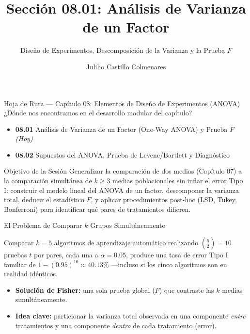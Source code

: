 \documentclass[10pt, aspectratio=169]{beamer}
\title[ANOVA de un Factor]{Sección 08.01: Análisis de Varianza de un Factor}
\subtitle{Diseño de Experimentos, Descomposición de la Varianza y la Prueba $F$}
\author[J. Castillo Colmenares]{Juliho Castillo Colmenares}
\institute{Tecnológico de Monterrey}
\date{\vspace{-1.2cm}}
\begin{document}
\begin{frame}[plain]
  \vspace{-0.8cm}
  \titlepage
\end{frame}

\begin{frame}{Hoja de Ruta --- Capítulo 08: Elementos de Diseño de Experimentos (ANOVA)}
  \footnotesize
  ¿Dónde nos encontramos en el desarrollo modular del capítulo? \pause
  \begin{itemize}\itemsep=0.08em
    \item \textbf{08.01} Análisis de Varianza de un Factor (One-Way ANOVA) y Prueba $F$ \emph{(Hoy)} \pause
    \item \textbf{08.02} Supuestos del ANOVA, Prueba de Levene/Bartlett y Diagnóstico
  \end{itemize}
  \vspace{-0.05cm}
  \begin{block}{Objetivo de la Sesión}
    Generalizar la comparación de dos medias (Capítulo 07) a la comparación simultánea de $k \geq 3$ medias poblacionales sin inflar el error Tipo I: construir el modelo lineal del ANOVA de un factor, descomponer la varianza total, deducir el estadístico $F$, y aplicar procedimientos post-hoc (LSD, Tukey, Bonferroni) para identificar qué pares de tratamientos difieren.
  \end{block}
\end{frame}

\begin{frame}{El Problema de Comparar $k$ Grupos Simultáneamente}
  \footnotesize
  \begin{motivacion}
    Comparar $k=5$ algoritmos de aprendizaje automático realizando $\binom{5}{2}=10$ pruebas $t$ por pares, cada una a $\alpha=0.05$, produce una tasa de error Tipo I familiar de $1-(0.95)^{10}\approx 40.13\%$ ---incluso si los cinco algoritmos son en realidad idénticos.
  \end{motivacion}

  \vspace{0.15cm}
  \pause
  \begin{itemize}\itemsep=0.1cm
    \item \textbf{Solución de Fisher:} una sola prueba global ($F$) que contraste las $k$ medias simultáneamente. \pause
    \item \textbf{Idea clave:} particionar la varianza total observada en una componente \emph{entre} tratamientos y una componente \emph{dentro} de cada tratamiento (error).
  \end{itemize}
\end{frame}
\end{document}
